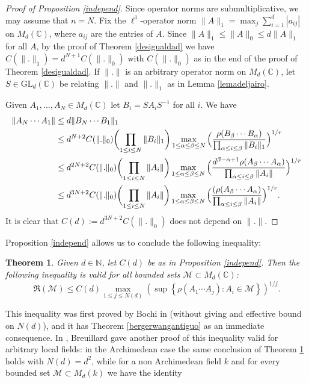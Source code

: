 \documentclass[11pt]{article}
\let\mathcal\mathscr
\theoremstyle{plain}
\newtheorem{teo}{Theorem}[section]
\theoremstyle{definition}
\newcommand{\NN}{\mathbb{N}}
\newcommand{\CC}{\mathbb{C}}
\newcommand{\corchete}[1]{\left\{{#1}\right\}}
\begin{document}
\begin{proof}[Proof of Proposition \ref{independ}]
Since operator norms are submultiplicative, we may assume that $n=N$. Fix the $\ell^1$-operator norm $\|A\|_{1}=\max_{j}{\sum_{i=1}^{d}|a_{ij}|}$ on $M_{d}(\CC)$, where $a_{ij}$ are the entries of $A$. Since $\|A\|_1 \leq \|A\|_0 \leq d\|A\|_1$ for all $A$, by the proof of Theorem \ref{desigualdad} we have $C(\|.\|_1)=d^{N+1}C(\|.\|_0)$ with $C(\|.\|_0)$ as in the end of the proof of Theorem \ref{desigualdad}. If $\|.\|$ is an arbitrary operator norm on $M_{d}(\CC)$, let $S\in \mathrm{GL}_{d}(\CC)$ be relating $\|.\|$ and $\|.\|_{1}$ as in Lemma \ref{lemadeljairo}.

Given $A_{1},\dots,A_{N}\in M_{d}(\CC)$ let $B_{i}=SA_{i}S^{-1}$ for all $i$. We have
\begin{equation*}
\begin{split}
\|A_N\cdots A_1\| & \leq d\|B_N\cdots B_1\|_{1} \\
& \leq d^{N+2}C(\|.\|_0) \biggl(\prod_{1\leq i\leq N}{\|B_i\|_1}\biggr)\max_{1\leq \alpha\leq \beta\leq N}{ \Bigl( \frac{\rho(B_{\beta}\cdots B_{\alpha}) }{ \prod_{\alpha\leq i\leq \beta}{\|B_i\|_1}} \Bigr)^{1/r}} \\
& \leq d^{2N+2}C(\|.\|_0)\biggl(\prod_{1\leq i\leq N}{\|A_i\|}\biggr)\max_{1\leq \alpha\leq \beta\leq N}{ \Bigl( \frac{{d}^{\beta-\alpha+1}\rho(A_{\beta}\cdots A_{\alpha}) }{ \prod_{\alpha\leq i\leq \beta}{\|A_i\|}} \Bigr)^{1/r}} \\
& \leq d^{3N+2}C(\|.\|_0)\biggl(\prod_{1\leq i\leq N}{\|A_i\|}\biggr)\max_{1\leq \alpha\leq \beta\leq N}{ \Bigl( \frac{(\rho(A_{\beta}\cdots A_{\alpha}) }{ \prod_{\alpha\leq i\leq \beta}{\|A_i\|}} \Bigr)^{1/r}}.
\end{split}
\end{equation*}
It is clear that $C(d):=d^{3N+2}C(\|.\|_0)$ does not depend on $\|.\|$.
\end{proof}
Proposition \ref{independ} allows us to conclude the following inequality:
\begin{teo}\label{detodos} Given $d\in \NN$, let $C(d)$ be as in Proposition \ref{independ}. Then the following inequality is valid for all bounded sets $\mathcal{M}\subset M_{d}(\mathbb{C})$:
\begin{equation*}
\mathfrak{R}(\mathcal{M})\leq C(d)\max_{1\leq j\leq N(d)}{\left(\sup\corchete{\rho(A_{1}\cdots A_{j}) : A_{i}\in \mathcal{M}}\right)^{1/j}}.
\end{equation*}
\end{teo}
This inequality was first proved by Bochi in \cite{bociineq} (without giving and effective bound on $N(d)$), and it has Theorem \ref{bergerwangantiguo} as an immediate consequence. In \cite[Lem.\,2.1]{bro}, Breuillard gave another proof of this inequality valid for arbitrary local fields: in the Archimedean case the same conclusion of Theorem \ref{detodos} holds with $N(d)=d^2$, while for a non Archimedean field $k$ and for every bounded set $\mathcal{M}\subset M_d(k)$ we have the identity
\end{document}
